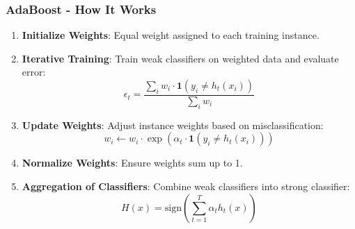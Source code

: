 \documentclass[aspectratio=169]{beamer}
\begin{document}
\begin{frame}[fragile]
    \frametitle{AdaBoost - How It Works}
    \begin{enumerate}
        \item \textbf{Initialize Weights}: Equal weight assigned to each training instance.
        \item \textbf{Iterative Training}: Train weak classifiers on weighted data and evaluate error:
        \begin{equation}
            \epsilon_t = \frac{\sum_{i} w_i \cdot \textbf{1}(y_i \neq h_t(x_i))}{\sum_{i} w_i}
        \end{equation}
        \item \textbf{Update Weights}: Adjust instance weights based on misclassification:
        \begin{equation}
            w_i \leftarrow w_i \cdot \exp(\alpha_t \cdot \textbf{1}(y_i \neq h_t(x_i)))
        \end{equation}
        \item \textbf{Normalize Weights}: Ensure weights sum up to 1.
        \item \textbf{Aggregation of Classifiers}: Combine weak classifiers into strong classifier:
        \begin{equation}
            H(x) = \text{sign}\left(\sum_{t=1}^{T} \alpha_t h_t(x)\right)
        \end{equation}
    \end{enumerate}
\end{frame}
\end{document}
